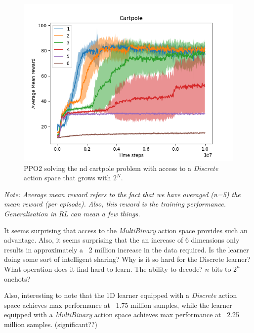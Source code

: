 \begin{figure}
\centering
\includegraphics[width=1\textwidth,height=0.5\textheight]{../../pictures/figures/discrete-nd-cart.png}
\caption{PPO2 solving the nd cartpole problem with access to a \textit{Discrete} action space that grows with $2^N$.}
\end{figure}


\textit{Note: Average mean reward refers to the fact that we have averaged (n=5)
the mean reward (per episode). Also, this reward is the training performance.
Generalisation in RL can mean a few things.}

It seems surprising that access to the \textit{MultiBinary} action space provides such an advantage.
Also, it seems surprising that the an increase of 6 dimensions only results in approximately a ~2 million increase in the data required.
Is the learner doing some sort of intelligent sharing?
Why is it so hard for the Discrete learner? What operation does it find hard to learn. The ability to decode? $n$ bits to $2^n$ onehots?

Also, interesting to note that the 1D learner equipped with a \textit{Discrete}
action space achieves max performance at ~1.75 million samples, while the learner
equipped with a \textit{MultiBinary} action space achieves max performance at ~2.25 million samples. (significant??)
